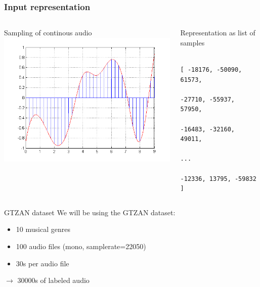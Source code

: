 \documentclass[aspectratio=169]{beamer}
\begin{document}
	\begin{frame}[fragile]
		\frametitle{Input representation}
		\begin{columns}[T]
		    \begin{column}{.5\textwidth}
		    	\begin{block}{Sampling of continous audio}
					\includegraphics[width=\textwidth]{images/signal_sampling.png}
		   		\end{block}
		    \end{column}
		    \begin{column}{.5\textwidth}
		    	\begin{block}{Representation as list of samples}
		    		\begin{verbatim}
		    			[ -18176, -50090, 61573,
		    			  -27710, -55937, 57950,
		    			  -16483, -32160, 49011,
		    			  ...
		    			  -12336, 13795, -59832 ]
		    		\end{verbatim}
		    	\end{block}
		    \end{column}
		  \end{columns}
	\end{frame}

	\begin{frame}{GTZAN dataset}
		We will be using the GTZAN dataset:
		\vfill
		\begin{itemize} 
			\item 10 musical genres
			\item 100 audio files (mono, samplerate=22050)
			\item 30s per audio file
		\end{itemize}
		\vfill
		$\rightarrow$ 30000s of labeled audio
	\end{frame}
\end{document}
